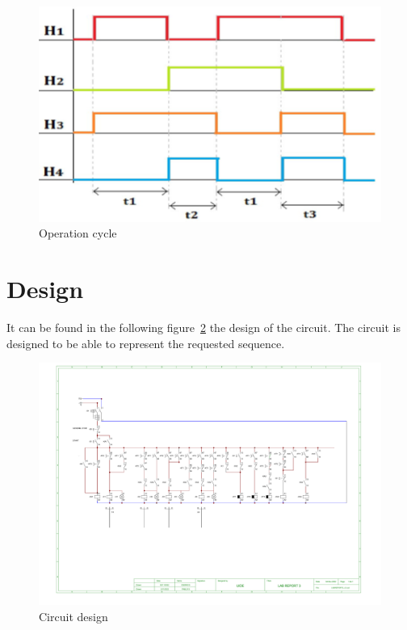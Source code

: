 \documentclass[runningheads]{llncs}
\begin{document}
\begin{figure}[h]
    \centering
    \caption{Operation cycle}\label{fig:sequence}
    \includegraphics[scale = 0.75]{sequence.png}
\end{figure}

\section{Design}

It can be found in the following figure~\ref{fig:circuit} the design of the circuit. The circuit is designed to be able to represent the requested sequence.


\begin{figure}[h]
    \centering
    \caption{Circuit design}\label{fig:circuit}
    \includegraphics[width=\linewidth]{images/circuit.pdf}
\end{figure}
\end{document}
